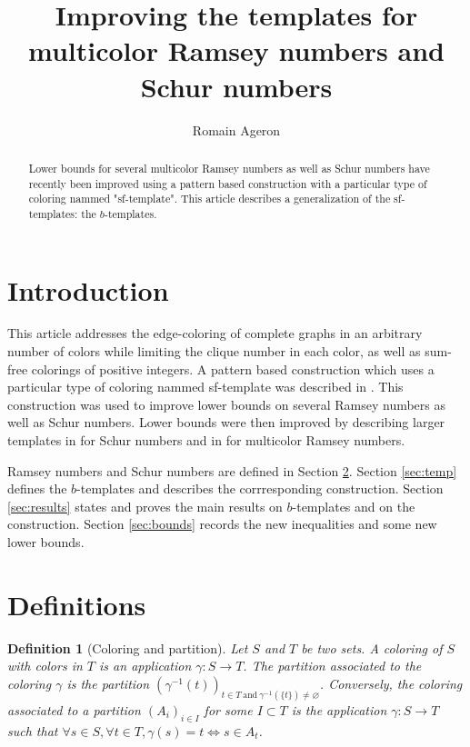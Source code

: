 \documentclass{article}
\title{Improving the templates for multicolor Ramsey numbers and Schur numbers}
\author{Romain Ageron}
\newtheorem{definition}{Definition}[section]
\begin{document}
\maketitle

\begin{abstract}
Lower bounds for several multicolor Ramsey numbers as well as Schur numbers have recently been improved using a 
pattern based construction with a particular type of coloring nammed "sf-template". This article describes a 
generalization of the sf-templates: the \(b\)-templates.
\end{abstract}

\section{Introduction}

This article addresses the edge-coloring of complete graphs in an arbitrary number of colors while limiting the clique 
number in each color, as well as sum-free colorings of positive integers. A pattern based construction which uses a 
particular type of coloring nammed sf-template was described in \cite{RowleyRamsey}. This construction was used to 
improve lower bounds on several Ramsey numbers as well as Schur numbers. Lower bounds were then improved by describing 
larger templates in \cite{schurboyz} for Schur numbers and in \cite{rowleyramseysat} for multicolor Ramsey numbers.

Ramsey numbers and Schur numbers are defined in Section \ref{sec:def}. Section \ref{sec:temp} defines the 
\(b\)-templates and describes the corrresponding construction. Section \ref{sec:results} states and proves the main 
results on \(b\)-templates and on the construction. Section \ref{sec:bounds} records the new inequalities and some new 
lower bounds.

\section{Definitions}
\label{sec:def}

\begin{definition}[Coloring and partition]
Let \(S\) and \(T\) be two sets. A coloring of \(S\) with colors in \(T\) is an application 
\(\gamma: S \rightarrow T\). The partition associated to the coloring \(\gamma\) is the partition 
\((\gamma^{-1}(t))_{t \in T ~\text{and}~ \gamma^{-1}(\{t\}) \neq \varnothing}\). Conversely, the coloring associated to 
a partition \((A_i)_{i \in I}\) for some \(I \subset T\) is the application \(\gamma: S \rightarrow T\) such that 
\(\forall s \in S, \forall t \in T, \gamma(s) = t \iff s \in A_t\).
\end{definition}
\end{document}
